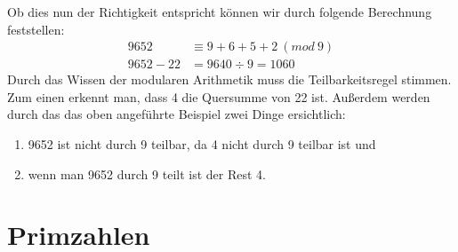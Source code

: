 \documentclass[12pt,a4paper]{article}
\theoremstyle{definition}
\begin{document}
Ob dies nun der Richtigkeit entspricht können wir durch folgende Berechnung feststellen:
\begin{align}
9652      &\equiv 9 + 6 + 5 + 2\ (mod\ 9) \\
9652 - 22 &= 9640 \div 9 = 1060
\end{align}
Durch das Wissen der modularen Arithmetik muss die Teilbarkeitsregel stimmen.
Zum einen erkennt man, dass 4 die Quersumme von 22 ist.
Außerdem werden durch das das oben angeführte Beispiel zwei Dinge ersichtlich:
\begin{enumerate}
    \item 9652 ist nicht durch 9 teilbar, da 4 nicht durch 9 teilbar ist und
    \item wenn man 9652 durch 9 teilt ist der Rest 4.
\end{enumerate}

\newpage
\section{Primzahlen}\label{Primzahlen}
\end{document}
